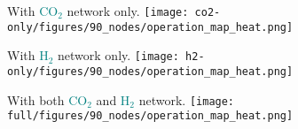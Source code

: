 \documentclass[12pt, aspectratio=169]{beamer}
\newcommand{\carbon}{\textcolor{teal}{CO$_2$}}
\newcommand{\hydrogen}{\textcolor{teal}{H$_2$}}
\begin{document}
\begin{frame}
    \begin{center}
    With \carbon{} network only.
    \texttt{[image: co2-only/figures/90\_nodes/operation\_map\_heat.png]}
    \end{center}
\end{frame}

\begin{frame}
    \begin{center}
    With \hydrogen{} network only.
    \texttt{[image: h2-only/figures/90\_nodes/operation\_map\_heat.png]}
    \end{center}
\end{frame}


\begin{frame}
    \begin{center}
    With both \carbon{}  and \hydrogen{} network.
    \texttt{[image: full/figures/90\_nodes/operation\_map\_heat.png]}
    \end{center}
\end{frame}
\end{document}
